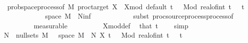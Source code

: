 \begin{isabellebody}
\ \ \ \ \isamarkupfalse%
\ {\isacharminus}{\kern0pt}\isanewline
\ \ \ \ \ \ \isamarkupfalse%
\ {}{\isacharcolon}{\kern0pt}\ {\isachardoublequoteopen}{\isacharparenleft}{\kern0pt}prob{\isacharunderscore}{\kern0pt}space{\isachardot}{\kern0pt}process{\isacharunderscore}{\kern0pt}of\ {\isacharquery}{\kern0pt}M\ {\isacharparenleft}{\kern0pt}proc{\isacharunderscore}{\kern0pt}target\ X{\isacharparenright}{\kern0pt}\ {\isacharbraceleft}{\kern0pt}{}{\isachardot}{\kern0pt}{\isachardot}{\kern0pt}{\isacharbraceright}{\kern0pt}\ X{\isacharunderscore}{\kern0pt}mod\ default{\isacharparenright}{\kern0pt}\ t\ {\isasymomega}\ {\isacharequal}{\kern0pt}\ {\isacharparenleft}{\kern0pt}Mod\ {\isacharparenleft}{\kern0pt}real{\isacharunderscore}{\kern0pt}of{\isacharunderscore}{\kern0pt}int\ {\isasymlfloor}t{\isasymrfloor}\ {\isacharplus}{\kern0pt}\ {}{\isacharparenright}{\kern0pt}{\isacharparenright}{\kern0pt}\ t\ {\isasymomega}{\isachardoublequoteclose}\isanewline
\ \ \ \ \ \ \ \ \ \ \ {\isachardoublequoteopen}{\isasymomega}\ {\isasymin}\ space\ {\isacharquery}{\kern0pt}M\ {\isacharminus}{\kern0pt}\ N{\isacharunderscore}{\kern0pt}inf{\isachardoublequoteclose}\ \ {\isasymomega}\isanewline
\ \ \ \ \ \ \ \ \isamarkupfalse%
\ {\isacharparenleft}{\kern0pt}subst\ proc{\isacharunderscore}{\kern0pt}source{\isachardot}{\kern0pt}process{\isacharunderscore}{\kern0pt}process{\isacharunderscore}{\kern0pt}of{\isacharparenright}{\kern0pt}\isanewline
\ \ \ \ \ \ \ \ \isamarkupfalse%
\ measurable\isanewline
\ \ \ \ \ \ \ \ \isamarkupfalse%
\ X{\isacharunderscore}{\kern0pt}mod{\isacharunderscore}{\kern0pt}def\ \isamarkupfalse%
\ that\ {\isacartoucheopen}t\ {\isasymin}\ {\isacharbraceleft}{\kern0pt}{}{\isachardot}{\kern0pt}{\isachardot}{\kern0pt}{\isacharbraceright}{\kern0pt}{\isacartoucheclose}\ \isamarkupfalse%
\ simp\isanewline
\ \ \ \ \ \ \ \ \isamarkupfalse%
\isanewline
\ \ \ \ \ \ \isamarkupfalse%
\ {\isachardoublequoteopen}{\isasymexists}N\ {\isasymin}\ null{\isacharunderscore}{\kern0pt}sets\ {\isacharquery}{\kern0pt}M{\isachardot}{\kern0pt}\ {\isasymforall}{\isasymomega}\ {\isasymin}\ space\ {\isacharquery}{\kern0pt}M\ {\isacharminus}{\kern0pt}\ N{\isachardot}{\kern0pt}\ X\ t\ {\isasymomega}\ {\isacharequal}{\kern0pt}\ {\isacharparenleft}{\kern0pt}Mod\ {\isacharparenleft}{\kern0pt}real{\isacharunderscore}{\kern0pt}of{\isacharunderscore}{\kern0pt}int\ {\isasymlfloor}t{\isasymrfloor}\ {\isacharplus}{\kern0pt}\ {}{\isacharparenright}{\kern0pt}{\isacharparenright}{\kern0pt}\ t\ {\isasymomega}{\isachardoublequoteclose}\isanewline

\end{isabellebody}
